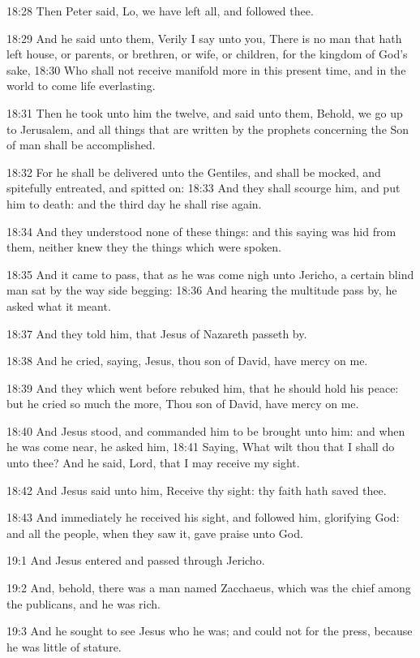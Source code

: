 18:28 Then Peter said, Lo, we have left all, and followed thee.

18:29 And he said unto them, Verily I say unto you, There is no man
that hath left house, or parents, or brethren, or wife, or children,
for the kingdom of God's sake, 18:30 Who shall not receive manifold
more in this present time, and in the world to come life everlasting.

18:31 Then he took unto him the twelve, and said unto them, Behold, we
go up to Jerusalem, and all things that are written by the prophets
concerning the Son of man shall be accomplished.

18:32 For he shall be delivered unto the Gentiles, and shall be
mocked, and spitefully entreated, and spitted on: 18:33 And they shall
scourge him, and put him to death: and the third day he shall rise
again.

18:34 And they understood none of these things: and this saying was
hid from them, neither knew they the things which were spoken.

18:35 And it came to pass, that as he was come nigh unto Jericho, a
certain blind man sat by the way side begging: 18:36 And hearing the
multitude pass by, he asked what it meant.

18:37 And they told him, that Jesus of Nazareth passeth by.

18:38 And he cried, saying, Jesus, thou son of David, have mercy on
me.

18:39 And they which went before rebuked him, that he should hold his
peace: but he cried so much the more, Thou son of David, have mercy on
me.

18:40 And Jesus stood, and commanded him to be brought unto him: and
when he was come near, he asked him, 18:41 Saying, What wilt thou that
I shall do unto thee? And he said, Lord, that I may receive my sight.

18:42 And Jesus said unto him, Receive thy sight: thy faith hath saved
thee.

18:43 And immediately he received his sight, and followed him,
glorifying God: and all the people, when they saw it, gave praise unto
God.

19:1 And Jesus entered and passed through Jericho.

19:2 And, behold, there was a man named Zacchaeus, which was the chief
among the publicans, and he was rich.

19:3 And he sought to see Jesus who he was; and could not for the
press, because he was little of stature.

